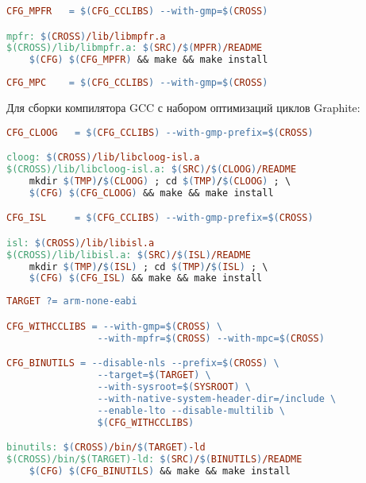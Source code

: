 \begin{lstlisting}[language=make]
CFG_MPFR   = $(CFG_CCLIBS) --with-gmp=$(CROSS)

mpfr: $(CROSS)/lib/libmpfr.a
$(CROSS)/lib/libmpfr.a: $(SRC)/$(MPFR)/README
	$(CFG) $(CFG_MPFR) && make && make install
\end{lstlisting}

\begin{lstlisting}[language=make]
CFG_MPC    = $(CFG_CCLIBS) --with-gmp=$(CROSS)
\end{lstlisting}

Для сборки компилятора GCC с набором оптимизаций циклов Graphite:

\begin{lstlisting}[language=make]
CFG_CLOOG	= $(CFG_CCLIBS) --with-gmp-prefix=$(CROSS)

cloog: $(CROSS)/lib/libcloog-isl.a
$(CROSS)/lib/libcloog-isl.a: $(SRC)/$(CLOOG)/README
	mkdir $(TMP)/$(CLOOG) ; cd $(TMP)/$(CLOOG) ; \ 
	$(CFG) $(CFG_CLOOG) && make && make install

CFG_ISL		= $(CFG_CCLIBS) --with-gmp-prefix=$(CROSS)

isl: $(CROSS)/lib/libisl.a
$(CROSS)/lib/libisl.a: $(SRC)/$(ISL)/README
	mkdir $(TMP)/$(ISL) ; cd $(TMP)/$(ISL) ; \ 
	$(CFG) $(CFG_ISL) && make && make install
\end{lstlisting}

\clearpage
\begin{lstlisting}[language=make]
TARGET ?= arm-none-eabi

CFG_WITHCCLIBS = --with-gmp=$(CROSS) \
				--with-mpfr=$(CROSS) --with-mpc=$(CROSS)

CFG_BINUTILS = --disable-nls --prefix=$(CROSS) \
				--target=$(TARGET) \
				--with-sysroot=$(SYSROOT) \
				--with-native-system-header-dir=/include \
				--enable-lto --disable-multilib \
				$(CFG_WITHCCLIBS)

binutils: $(CROSS)/bin/$(TARGET)-ld
$(CROSS)/bin/$(TARGET)-ld: $(SRC)/$(BINUTILS)/README
	$(CFG) $(CFG_BINUTILS) && make && make install
\end{lstlisting}
